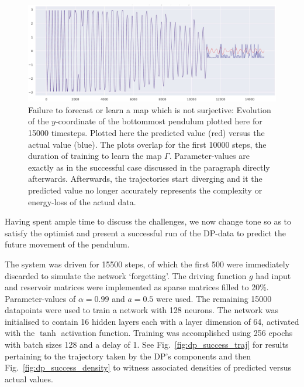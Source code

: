 \begin{figure}[ht]
  \includegraphics[scale=0.3]{Graphs/_dpfail_nonsurj.eps}
  \centering
\caption{Failure to forecast or learn a map which is not surjective: Evolution of the $y$-coordinate of the bottommost pendulum plotted here for 15000 timesteps. Plotted here the predicted value (red) versus the actual value (blue). The plots overlap for the first 10000 steps, the duration of training to learn the map $\Gamma$. Parameter-values are exactly as in the successful case discussed in the paragraph directly afterwards. Afterwards, the trajectories start diverging and it the predicted value no longer accurately represents the complexity or energy-loss of the actual data. }
\label{fig:dp_notsurjective}
\end{figure}


Having spent ample time to discuss the challenges, we now change tone so as to satisfy the optimist and present a successful run of the DP-data to predict the future movement of the pendulum.

The system was driven for 15500 steps, of which the first 500 were immediately discarded to simulate the network `forgetting'. The driving function $g$ had input and reservoir matrices were implemented as sparse matrices filled to 20\%. Parameter-values of $\alpha=0.99$ and $a=0.5$ were used.
The remaining 15000 datapoints were used to train a network with 128 neurons. 
The network was initialised to contain 16 hidden layers each with a layer dimension of 64, activated with the $\tanh$ activation function.
Training was accomplished using 256 epochs with batch sizes 128 and a delay of 1. See Fig.~\ref{fig:dp_success_traj} for results pertaining to the trajectory taken by the DP's components and then Fig.~\ref{fig:dp_success_density} to witness associated densities of predicted versus actual values.


